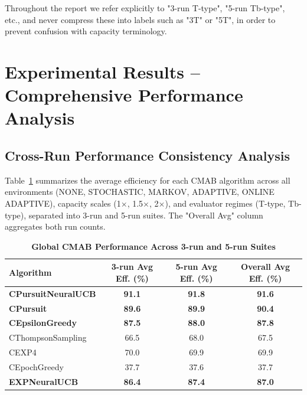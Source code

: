 \documentclass[12pt,a4paper]{article}
\newcommand{\performance}[1]{\textcolor{performancecolor}{\textbf{#1}}}
\newcommand{\legacy}[1]{\textcolor{legacycolor}{\textbf{#1}}}
\newcommand{\neural}[1]{\textcolor{neuralcolor}{\textbf{#1}}}
\begin{document}
Throughout the report we refer explicitly to "3-run T-type", "5-run Tb-type", etc., and never compress these into labels such as "3T" or "5T", in order to prevent confusion with capacity terminology.

\newpage
\section{Experimental Results – Comprehensive Performance Analysis}

\begin{tcolorbox}[colback=performancecolor!10,colframe=performancecolor,title=\textbf{Primary Performance Results (Aggregated Across Capacities, Environments, and Regimes)}]

\subsection{Cross-Run Performance Consistency Analysis}

Table~\ref{tab:global-performance} summarizes the average efficiency for each CMAB algorithm across all environments (NONE, STOCHASTIC, MARKOV, ADAPTIVE, ONLINE ADAPTIVE), capacity scales (1$\times$, 1.5$\times$, 2$\times$), and evaluator regimes (T-type, Tb-type), separated into 3-run and 5-run suites. The "Overall Avg" column aggregates both run counts.

\begin{table}[H]
\centering
\caption{\performance{Global CMAB Performance Across 3-run and 5-run Suites}}
\label{tab:global-performance}
\begin{tabular}{|l|c|c|c|}
\hline
\textbf{Algorithm} & \textbf{3-run Avg Eff. (\%)} & \textbf{5-run Avg Eff. (\%)} & \textbf{Overall Avg Eff. (\%)} \\
\hline
\hline
\neural{CPursuitNeuralUCB}   & \neural{91.1}     & \neural{91.8}     & \neural{\textbf{91.6}} \\
\performance{CPursuit}        & \performance{89.6} & \performance{89.9} & \performance{\textbf{90.4}} \\
\performance{CEpsilonGreedy} & \performance{87.5} & \performance{88.0} & \performance{\textbf{87.8}} \\
CThompsonSampling            & 66.5              & 68.0              & 67.5 \\
CEXP4                        & 70.0              & 69.9              & 69.9 \\
CEpochGreedy                 & 37.7              & 37.6              & 37.7 \\
\legacy{EXPNeuralUCB}        & \legacy{86.4}     & \legacy{87.4}     & \legacy{87.0} \\
\hline
\end{tabular}
\end{table}


\end{tcolorbox}
\end{document}
